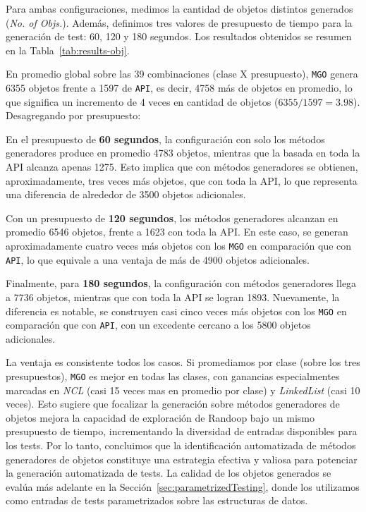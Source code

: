 Para ambas configuraciones, medimos la cantidad de objetos distintos 
generados (\emph{No. of Objs.}). Además, definimos tres valores de presupuesto de tiempo para la generación de 
test: 60, 120 y 180 segundos. Los resultados obtenidos se resumen en la
Tabla~\ref{tab:results-obj}.

En promedio global sobre las 39 combinaciones (clase X presupuesto),
\texttt{MGO} genera 6355 objetos frente a 1597 de
\texttt{API}, es decir, 4758 más de objetos en promedio, lo que significa un
incremento de 4 veces en cantidad de objetos (\(6355/1597=3.98\)). Desagregando por presupuesto:

En el presupuesto de \textbf{60 segundos}, la configuración con solo los 
métodos generadores produce en promedio 4783 objetos, mientras 
que la basada en toda la API alcanza apenas 1275. Esto implica 
que con métodos generadores se obtienen, aproximadamente, tres veces más objetos, que con toda la API,
lo que representa una diferencia de alrededor de 3500 objetos adicionales. 

Con un presupuesto de \textbf{120 segundos}, los métodos generadores 
alcanzan en promedio 6546 objetos, frente a 1623 con 
toda la API. En este caso, se generan aproximadamente cuatro veces más 
objetos con los \texttt{MGO} en comparación que con \texttt{API},
lo que equivale a una ventaja de más de 4900 objetos adicionales. 

Finalmente, para \textbf{180 segundos}, la configuración con métodos 
generadores llega a 7736 objetos, mientras que con toda la API 
se logran 1893. Nuevamente, la diferencia es notable, se 
construyen casi cinco veces más objetos con los \texttt{MGO} en comparación que con \texttt{API}, 
con un excedente cercano a los 5800 objetos adicionales.

La ventaja es consistente todos los casos. Si
promediamos por clase (sobre los tres presupuestos), \texttt{MGO} es mejor
en todas las clases, con ganancias especialmentes marcadas en \emph{NCL} (casi 15 veces mas en promedio por clase) y \emph{LinkedList}
(casi 10 veces). Esto sugiere que focalizar la generación sobre métodos generadores de objetos mejora la
capacidad de exploración de Randoop bajo un mismo presupuesto de tiempo, incrementando la diversidad de entradas disponibles para los tests.
Por lo tanto, concluimos que la identificación automatizada de métodos generadores de objetos 
constituye una estrategia efectiva y valiosa para potenciar la generación automatizada de tests.
La calidad de los objetos generados se evalúa más adelante en la Sección~\ref{sec:parametrizedTesting}, 
donde los utilizamos como entradas de tests parametrizados sobre las estructuras de datos. 

